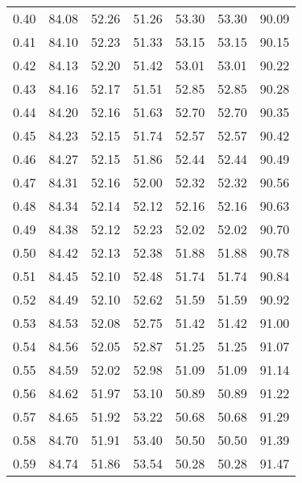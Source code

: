 \begin{tabular}{|c|c|c|c|c|c|c|}
      0.40 &     84.08 &     52.26 &      51.26 &   53.30 &      53.30 &         90.09 \\
      0.41 &     84.10 &     52.23 &      51.33 &   53.15 &      53.15 &         90.15 \\
      0.42 &     84.13 &     52.20 &      51.42 &   53.01 &      53.01 &         90.22 \\
      0.43 &     84.16 &     52.17 &      51.51 &   52.85 &      52.85 &         90.28 \\
      0.44 &     84.20 &     52.16 &      51.63 &   52.70 &      52.70 &         90.35 \\
      0.45 &     84.23 &     52.15 &      51.74 &   52.57 &      52.57 &         90.42 \\
      0.46 &     84.27 &     52.15 &      51.86 &   52.44 &      52.44 &         90.49 \\
      0.47 &     84.31 &     52.16 &      52.00 &   52.32 &      52.32 &         90.56 \\
      0.48 &     84.34 &     52.14 &      52.12 &   52.16 &      52.16 &         90.63 \\
      0.49 &     84.38 &     52.12 &      52.23 &   52.02 &      52.02 &         90.70 \\
      0.50 &     84.42 &     52.13 &      52.38 &   51.88 &      51.88 &         90.78 \\
      0.51 &     84.45 &     52.10 &      52.48 &   51.74 &      51.74 &         90.84 \\
      0.52 &     84.49 &     52.10 &      52.62 &   51.59 &      51.59 &         90.92 \\
      0.53 &     84.53 &     52.08 &      52.75 &   51.42 &      51.42 &         91.00 \\
      0.54 &     84.56 &     52.05 &      52.87 &   51.25 &      51.25 &         91.07 \\
      0.55 &     84.59 &     52.02 &      52.98 &   51.09 &      51.09 &         91.14 \\
      0.56 &     84.62 &     51.97 &      53.10 &   50.89 &      50.89 &         91.22 \\
      0.57 &     84.65 &     51.92 &      53.22 &   50.68 &      50.68 &         91.29 \\
      0.58 &     84.70 &     51.91 &      53.40 &   50.50 &      50.50 &         91.39 \\
      0.59 &     84.74 &     51.86 &      53.54 &   50.28 &      50.28 &         91.47 \\

\end{tabular}
